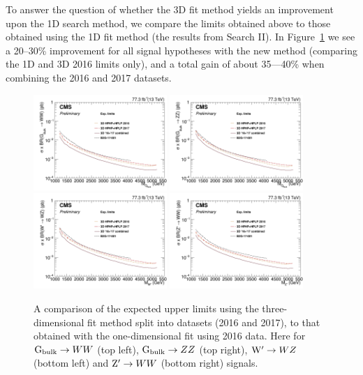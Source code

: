 To answer the question of whether the 3D fit method yields an improvement upon the 1D search method, we compare the limits obtained above to those obtained using the 1D fit method (the results from Search II). In Figure~\ref{fig:limitsCompare} we see a 20--30\% improvement for all signal hypotheses with the new method (comparing the 1D and 3D 2016 limits only), and a total gain of about 35---40\% when combining the 2016 and 2017 datasets.
\begin{figure}[h!]
\centering
\includegraphics[width=0.45\textwidth]{figures/analysis/search3/AN-17-303/limits/limits_BulkGWW_compare.png}
\includegraphics[width=0.45\textwidth]{figures/analysis/search3/AN-17-303/limits/limits_BulkGZZ_compare.png}\\
\includegraphics[width=0.45\textwidth]{figures/analysis/search3/AN-17-303/limits/limits_WprimeWZ_compare.png}
\includegraphics[width=0.45\textwidth]{figures/analysis/search3/AN-17-303/limits/limits_ZprimeWW_compare.png}
\caption{A comparison of the expected upper limits using the three-dimensional fit method split into datasets (2016 and 2017), to that obtained with the one-dimensional fit using 2016 data. Here for $\mathrm{G}_\mathrm{bulk}\rightarrow WW$ (top left), $\mathrm{G}_\mathrm{bulk}\rightarrow ZZ$ (top right), $\mathrm{W}^\prime\rightarrow WZ$ (bottom left) and $\mathrm{Z}^\prime\rightarrow WW$ (bottom right) signals.}
\label{fig:limitsCompare}
\end{figure}

